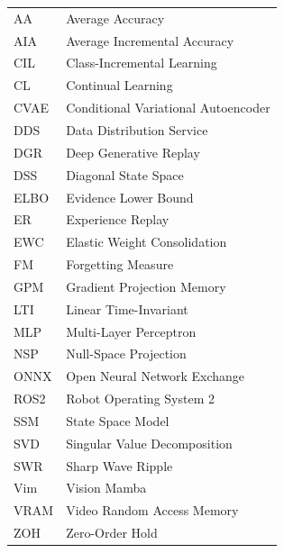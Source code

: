 
\begin{abbreviations}

\begin{longtable}{@{}p{2.5cm}l}
    AA      & Average Accuracy \\[0.3cm]
    AIA     & Average Incremental Accuracy \\[0.3cm]
    CIL     & Class-Incremental Learning \\[0.3cm]
    CL      & Continual Learning \\[0.3cm]
    CVAE    & Conditional Variational Autoencoder \\[0.3cm]
    DDS     & Data Distribution Service \\[0.3cm]
    DGR     & Deep Generative Replay \\[0.3cm]
    DSS     & Diagonal State Space \\[0.3cm]
    ELBO    & Evidence Lower Bound \\[0.3cm]
    ER      & Experience Replay \\[0.3cm]
    EWC     & Elastic Weight Consolidation \\[0.3cm]
    FM      & Forgetting Measure \\[0.3cm]
    GPM     & Gradient Projection Memory \\[0.3cm]
    LTI     & Linear Time-Invariant \\[0.3cm]
    MLP     & Multi-Layer Perceptron \\[0.3cm]
    NSP     & Null-Space Projection \\[0.3cm]
    ONNX    & Open Neural Network Exchange \\[0.3cm]
    ROS2    & Robot Operating System 2 \\[0.3cm]
    SSM     & State Space Model \\[0.3cm]
    SVD     & Singular Value Decomposition \\[0.3cm]
    SWR     & Sharp Wave Ripple \\[0.3cm]
    Vim     & Vision Mamba \\[0.3cm]
    VRAM    & Video Random Access Memory \\[0.3cm]
    ZOH     & Zero-Order Hold \\[0.3cm]
\end{longtable}

\end{abbreviations}
